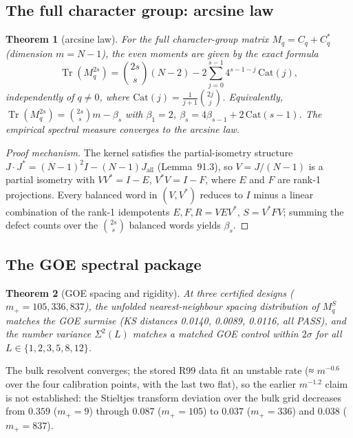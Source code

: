 \documentclass[11pt]{article}
\newtheorem{theorem}{Theorem}[section]
\begin{document}
\subsection{The full character group: arcsine law}\label{sec:arcsine}

\begin{theorem}[arcsine law]\label{thm:arcsine}
For the full character-group matrix $M_q = C_q + C_q^*$ (dimension
$m = N{-}1$), the even moments are given by the exact formula
\[
  \operatorname{Tr}(M_q^{2s}) = \binom{2s}{s}(N{-}2)
  - 2\sum_{j=0}^{s-1} 4^{s-1-j}\,\mathrm{Cat}(j),
\]
independently of $q \neq 0$, where
$\mathrm{Cat}(j) = \frac{1}{j+1}\binom{2j}{j}$.  Equivalently,
$\operatorname{Tr}(M_q^{2s}) = \binom{2s}{s}m - \beta_s$ with
$\beta_1 = 2$, $\beta_s = 4\beta_{s-1} + 2\,\mathrm{Cat}(s{-}1)$.
The empirical spectral measure converges to the arcsine law.
\end{theorem}

\begin{proof}[Proof mechanism]
The kernel satisfies the partial-isometry structure
$J \cdot J^* = (N{-}1)^2 I - (N{-}1)J_{\mathrm{all}}$
(Lemma~91.3), so $V = J/(N{-}1)$ is a partial isometry with
$V V^* = I - E$, $V^* V = I - F$, where $E$ and $F$ are rank-1
projections.  Every balanced word in $(V, V^*)$ reduces to $I$ minus
a linear combination of the rank-1 idempotents $E, F, R = VEV^*$,
$S = V^*FV$; summing the defect counts over the
$\binom{2s}{s}$ balanced words yields $\beta_s$.
\end{proof}

\subsection{The GOE spectral package}

\begin{theorem}[GOE spacing and rigidity]\label{thm:goe}
At three certified designs ($m_+ = 105, 336, 837$), the unfolded
nearest-neighbour spacing distribution of $M_q^S$ matches the GOE
surmise (KS distances 0.0140, 0.0089, 0.0116, all PASS), and the
number variance $\Sigma^2(L)$ matches a matched GOE control within
$2\sigma$ for all $L \in \{1,2,3,5,8,12\}$.
\end{theorem}

The bulk resolvent converges; the stored R99 data fit an unstable rate
(≈ $m^{-0.6}$ over the four calibration points, with the last two
flat), so the earlier $m^{-1.2}$ claim is not established: the
Stieltjes
transform deviation over the bulk grid decreases from $0.359$ ($m_+ =
9$) through $0.087$ ($m_+ = 105$) to $0.037$ ($m_+ = 336$) and
$0.038$ ($m_+ = 837$).
\end{document}
